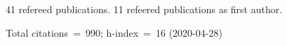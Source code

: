 41 refereed publications. 11 refeered publications as first author.

Total citations~=~990; h-index~=~16 (2020-04-28)